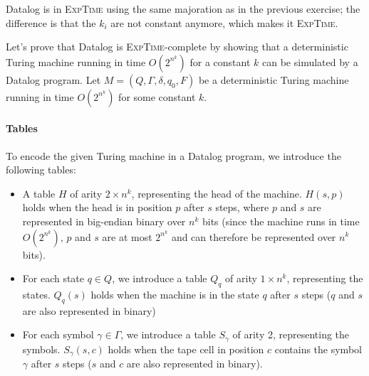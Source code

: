\documentclass{../../cs-classes/cs-classes}
\begin{document}
\begin{exercise}
    Datalog is in \textsc{ExpTime} using the same majoration as in the previous exercise; the difference is that the $k_i$ are not constant anymore, which makes it \textsc{ExpTime}.

    Let's prove that Datalog is \textsc{ExpTime}-complete by showing that a deterministic Turing machine running in time $O(2^{n^k})$ for a constant $k$ can be simulated by a Datalog program. Let $M=(Q, \Gamma, \delta, q_0, F)$ be a deterministic Turing machine running in time $O(2^{n^k})$ for some constant $k$.

    \paragraph*{Tables} To encode the given Turing machine in a Datalog program, we introduce the following tables:
    \begin{itemize}
        \item A table $H$ of arity $2\times n^k$, representing the head of the machine. $H(s, p)$ holds when the head is in position $p$ after $s$ steps, where $p$ and $s$ are represented in big-endian binary over $n^k$ bits (since the machine runs in time $O(2^{n^k})$, $p$ and $s$ are at most $2^{n^k}$ and can therefore be represented over $n^k$ bits).
        \item For each state $q\in Q$, we introduce a table $Q_q$ of arity $1\times n^k$, representing the states. $Q_q(s)$ holds when the machine is in the state $q$ after $s$ steps ($q$ and $s$ are also represented in binary)
        \item For each symbol $\gamma\in\Gamma$, we introduce a table $S_\gamma$ of arity 2, representing the symbols. $S_\gamma(s, c)$ holds when the tape cell in position $c$ contains the symbol $\gamma$ after $s$ steps ($s$ and $c$ are also represented in binary).
    \end{itemize}


\end{exercise}
\end{document}

